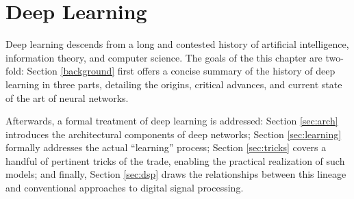 

\graphicspath{{3/figures/}}

\chapter{Deep Learning}
\label{chp:background}


%

Deep learning descends from a long and contested history of artificial intelligence, information theory, and computer science.
The goals of the this chapter are two-fold:
Section \ref{background} first offers a concise summary of the history of deep learning in three parts, detailing the origins, critical advances, and current state of the art of neural networks.

Afterwards, a formal treatment of deep learning is addressed:
Section \ref{sec:arch} introduces the architectural components of deep networks;
Section \ref{sec:learning} formally addresses the actual ``learning'' process;
Section \ref{sec:tricks} covers a handful of pertinent tricks of the trade, enabling the practical realization of such models;
and finally, Section \ref{sec:dsp} draws the relationships between this lineage and conventional approaches to digital signal processing.


